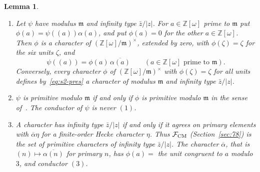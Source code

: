 \documentclass[11pt]{article}
\numberwithin{equation}{section}
\newcommand{\OO}{\mathbb Z[\omega]}
\newtheorem{lemma}{Lemma}
\begin{document}
\begin{lemma}\label{lem:s2-pres}
\begin{enumerate}
\item[(i)] Let $\psi$ have modulus $\mathfrak m$ and infinity type $\bar z/|z|$. For $a\in\OO$ prime to
 $\mathfrak m$ put $\phi(a)=\psi((a))\alpha(a)$, and put $\phi(a)=0$ for the other $a\in\OO$. Then $\phi$ is a
 character of $(\OO/\mathfrak m)^\times$, extended by zero, with $\phi(\zeta)=\zeta$ for the six units $\zeta$,
 and
 \begin{equation}\label{eq:s2-pres}
  \psi((a))=\phi(a)\,\overline{\alpha(a)}\qquad(a\in\OO\text{ prime to }\mathfrak m).
 \end{equation}
 Conversely, every character $\phi$ of $(\OO/\mathfrak m)^\times$ with $\phi(\zeta)=\zeta$ for all units
 defines by~\eqref{eq:s2-pres} a character of modulus $\mathfrak m$ and infinity type $\bar z/|z|$.
\item[(ii)] $\psi$ is primitive modulo $\mathfrak m$ if and only if $\phi$ is primitive modulo $\mathfrak m$ in
 the sense of~\cite[Section~4.2]{QF}. The conductor of $\psi$ is never $(1)$.
\item[(iii)] A character has infinity type $\bar z/|z|$ if and only if it agrees on primary elements with
 $\overline\alpha\eta$ for a finite-order Hecke character $\eta$. Thus $\mathcal F_{\rm CM}$ (Section~\ref{sec:78})
 is the set of primitive characters of infinity type $\bar z/|z|$. The character $\overline\alpha$, that is
 $(n)\mapsto\overline{\alpha(n)}$ for primary $n$, has $\phi(a)=$ the unit congruent to $a$ modulo $3$, and
 conductor $(3)$.
\end{enumerate}
\end{lemma}
\end{document}
